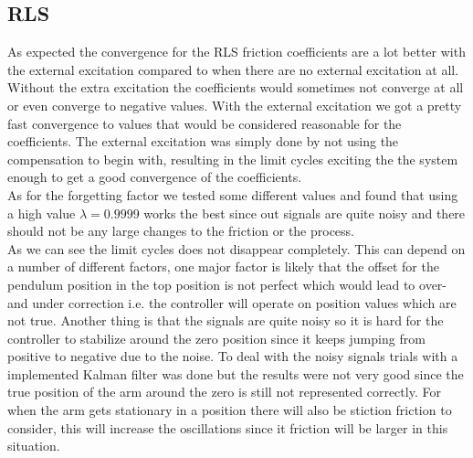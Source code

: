 \documentclass[10pt,a4paper]{article}
\begin{document}
\subsection{RLS}
As expected the convergence for the RLS friction coefficients are a lot better with the external excitation compared to when there are no external excitation at all. Without the extra excitation the coefficients would sometimes not converge at all or even converge to negative values. With the external excitation we got a pretty fast convergence to values that would be considered reasonable for the coefficients. The external excitation was simply done by not using the compensation to begin with, resulting in the limit cycles exciting the the system enough to get a good convergence of the coefficients.\\

As for the forgetting factor we tested some different values and found that using a high value $\lambda = 0.9999$ works the best since out signals are quite noisy and there should not be any large changes to the friction or the process. 
\\
As we can see the limit cycles does not disappear completely. This can depend on a number of different factors, one major factor is likely that the offset for the pendulum position in the top position is not perfect which would lead to over- and under correction i.e. the controller will operate on position values which are not true. Another thing is that the signals are quite noisy so it is hard for the controller to stabilize around the zero position since it keeps jumping from positive to negative due to the noise. To deal with the noisy signals trials with a implemented Kalman filter was done but the results were not very good since the true position of the arm around the zero is still not represented correctly. For when the arm gets stationary in a position there will also be stiction friction to consider, this will increase the oscillations since it friction will be larger in this situation.
\end{document}

